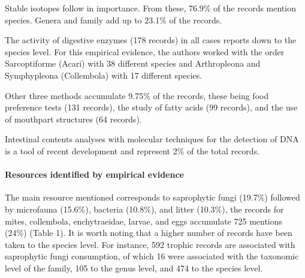 \documentclass[11pt]{article}
\begin{document}
Stable isotopes follow in importance. From these, 76.9\% of the records
mention species. Genera and family add up to 23.1\% of the records.

The activity of digestive enzymes (178 records) in all cases reports
down to the species level. For this empirical evidence, the authors
worked with the order Sarcoptiforme (Acari) with 38 different species
and Arthropleona and Symphypleona (Collembola) with 17 different
species.

Other three methods accumulate 9.75\% of the records, these being food
preference tests (131 records), the study of fatty acids (99 records),
and the use of mouthpart structures (64 records).

Intestinal contents analyses with molecular techniques for the detection
of DNA is a tool of recent development and represent 2\% of the total
records.

\hypertarget{resources-identified-by-empirical-evidence}{%
\paragraph{Resources identified by empirical
evidence}\label{resources-identified-by-empirical-evidence}}

The main resource mentioned corresponds to saprophytic fungi (19.7\%)
followed by microfauna (15.6\%), bacteria (10.8\%), and litter (10.3\%),
the records for mites, collembola, enchytraeidae, larvae, and eggs
accumulate 725 mentions (24\%) (Table 1). It is worth noting that a
higher number of records have been taken to the species level. For
instance, 592 trophic records are associated with saprophytic fungi
consumption, of which 16 were associated with the taxonomic level of the
family, 105 to the genus level, and 474 to the species level.
\end{document}
